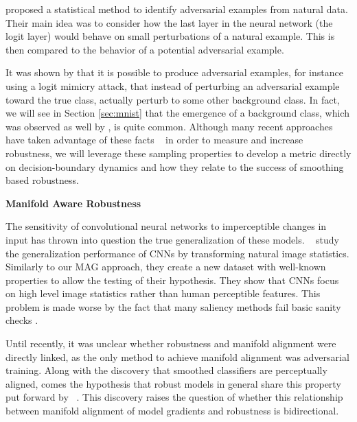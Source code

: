\citet{roth19aodds} proposed a statistical method to identify adversarial examples from natural data. Their main idea was to consider how the last layer in the neural network (the logit layer) would behave on small perturbations of a natural example. %
This is then compared to the behavior of a potential adversarial example. 

It was shown by \citet{hosseini2019odds} that it is possible to produce adversarial examples, for instance using a logit mimicry attack, that instead of perturbing an adversarial example toward the true class, actually perturb to some other background class. In fact, we will see in Section \ref{sec:mnist} that the emergence of a background class, which was observed as well by \citet{roth19aodds}, is quite common. Although many recent approaches have taken advantage of these facts ~\citep{taori2020shifts, lu2022randommasking, Osada_2023_WACV, blau2023classifier} in order to measure and increase robustness, we will leverage these sampling properties to develop a metric directly on decision-boundary dynamics and how they relate to the success of smoothing based robustness. 

{\bf Manifold Aware Robustness}

The sensitivity of convolutional neural networks to imperceptible changes in input has thrown into question the true generalization of these models.
~\citet{jo2017measuring} study the generalization performance of CNNs by transforming natural image statistics.  %
Similarly to our MAG approach, they create a new dataset with well-known properties to allow the testing of their hypothesis.
They show that CNNs focus on high level image statistics rather than human perceptible features.
This problem is made worse by the fact that many saliency methods fail basic sanity checks \citep{adebayo2018sanity, kindermans2019reliability}.

Until recently, it was unclear whether robustness and manifold alignment were directly linked, as the only method to achieve manifold alignment was adversarial training.
Along with the discovery that smoothed classifiers are perceptually
aligned, comes the hypothesis that robust models in general share this
property put forward by ~\citet{kaur2019perceptually}.
This discovery raises the question of whether this relationship
between manifold alignment of model gradients and robustness is bidirectional.

